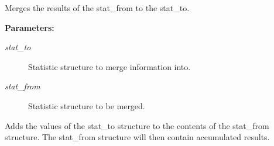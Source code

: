 Merges the results of the stat\_\-from to the stat\_\-to.

\begin{Desc}
\item[{\bf Parameters: }]\par
\begin{description}
\item[
{\em stat\_\-to}]Statistic structure to merge information into. \item[
{\em stat\_\-from}]Statistic structure to be merged.

\end{description}
\end{Desc}
Adds the values of the stat\_\-to structure to the contents of the stat\_\-from structure. The stat\_\-from structure will then contain accumulated results. 
